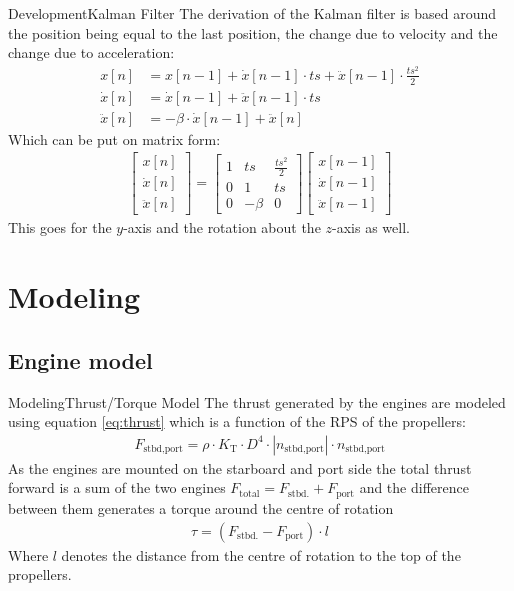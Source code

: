 \documentclass[10pt]{beamer}
\begin{document}
\begin{frame}{Development}{Kalman Filter}
The derivation of the Kalman filter is based around the position being equal to the last position, the change due to velocity and the change due to acceleration:
\begin{align}
x[n] &= x[n-1] + \dot{x}[n-1]\cdot ts + \ddot{x}[n-1]\cdot \frac{ts^2}{2}\\
\dot{x}[n] &= \dot{x}[n-1] + \ddot{x}[n-1] \cdot ts\\
\ddot{x}[n] &= -\beta \cdot \dot{x}[n-1] + \ddot{x}[n]
\end{align}
Which can be put on matrix form:
\begin{align}
\begin{bmatrix}
x[n]\\
\dot{x}[n]\\
\ddot{x}[n]
\end{bmatrix} = \begin{bmatrix}
1 & ts & \frac{ts^2}{2}\\
0 & 1 & ts\\
0 & -\beta & 0
\end{bmatrix}\begin{bmatrix}
x[n-1]\\
\dot{x}[n-1]\\
\ddot{x}[n-1]
\end{bmatrix}
\end{align}
This goes for the $y$-axis and the rotation about the $z$-axis as well.
\end{frame}


\section{Modeling}
\subsection{Engine model}
\begin{frame}{Modeling}{Thrust/Torque Model}
The thrust generated by the engines are modeled using equation \ref{eq:thrust} which is a function of the RPS of the propellers:
\begin{align}
F_\text{stbd,port} = \rho \cdot K_\text{T} \cdot D^4 \cdot |n_\text{stbd,port}| \cdot n_\text{stbd,port}
\label{eq:thrust}
\end{align}
As the engines are mounted on the starboard and port side the total thrust forward is a sum of the two engines $F_\text{total} = F_\text{stbd.} + F_\text{port}$ and the difference between them generates a torque around the centre of rotation
\begin{align}
\tau = (F_\text{stbd.} - F_\text{port}) \cdot l
\end{align}
Where $l$ denotes the distance from the centre of rotation to the top of the propellers.
\end{frame}
\end{document}
